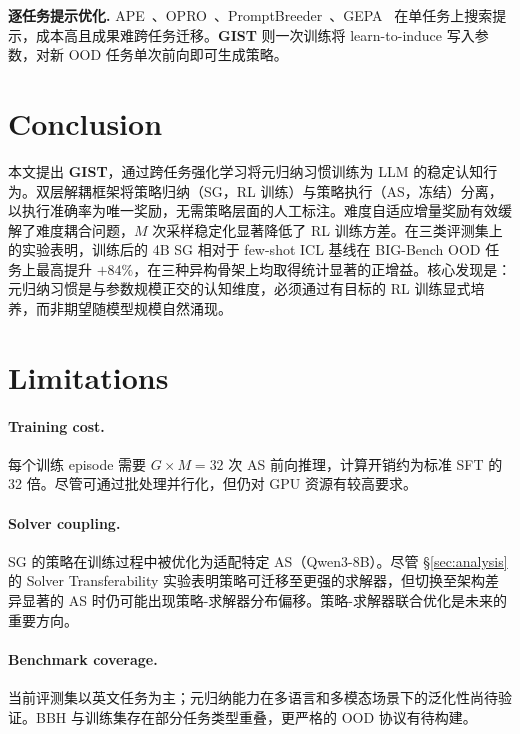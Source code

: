 \documentclass[11pt]{article}
\newcommand{\gist}{\textbf{GIST}}
\newcommand{\sg}{\textnormal{\textsc{SG}}}
\newcommand{\as}{\textnormal{\textsc{AS}}}
\begin{document}
\textbf{逐任务提示优化.} APE~\citep{zhou2023ape}、OPRO~\citep{yang2024opro}、PromptBreeder~\citep{fernando2023promptbreeder}、GEPA~\citep{agrawal2025gepa} 在单任务上搜索提示，成本高且成果难跨任务迁移。\gist{} 则一次训练将 learn-to-induce 写入参数，对新 OOD 任务单次前向即可生成策略。

\section{Conclusion}
\label{sec:conclusion}

本文提出 \gist{}，通过跨任务强化学习将元归纳习惯训练为 LLM 的稳定认知行为。双层解耦框架将策略归纳（\sg{}，RL 训练）与策略执行（\as{}，冻结）分离，以执行准确率为唯一奖励，无需策略层面的人工标注。难度自适应增量奖励有效缓解了难度耦合问题，$M$ 次采样稳定化显著降低了 RL 训练方差。在三类评测集上的实验表明，训练后的 4B \sg{} 相对于 few-shot ICL 基线在 BIG-Bench OOD 任务上最高提升 $+84\%$，在三种异构骨架上均取得统计显著的正增益。核心发现是：元归纳习惯是与参数规模正交的认知维度，必须通过有目标的 RL 训练显式培养，而非期望随模型规模自然涌现。

\section{Limitations}
\label{sec:limitations}

\paragraph{Training cost.}
每个训练 episode 需要 $G \times M = 32$ 次 \as{} 前向推理，计算开销约为标准 SFT 的 32 倍。尽管可通过批处理并行化，但仍对 GPU 资源有较高要求。

\paragraph{Solver coupling.}
\sg{} 的策略在训练过程中被优化为适配特定 \as{}（Qwen3-8B）。尽管 §\ref{sec:analysis} 的 Solver Transferability 实验表明策略可迁移至更强的求解器，但切换至架构差异显著的 \as{} 时仍可能出现策略-求解器分布偏移。策略-求解器联合优化是未来的重要方向。

\paragraph{Benchmark coverage.}
当前评测集以英文任务为主；元归纳能力在多语言和多模态场景下的泛化性尚待验证。BBH 与训练集存在部分任务类型重叠，更严格的 OOD 协议有待构建。
\end{document}
